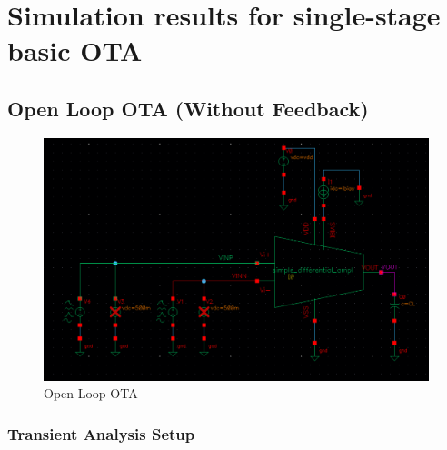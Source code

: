 \chapter{Simulation results  for single-stage basic OTA}
\label{ch:chap3}




\section{Open Loop OTA (Without Feedback)}
    \begin{figure}[h]
        \centering
           \includegraphics[width=1\textwidth]{images/single_ota.png}
        \caption{Open Loop OTA}
        \label{fig: }
    \end{figure}
    
\subsection{Transient Analysis Setup}

